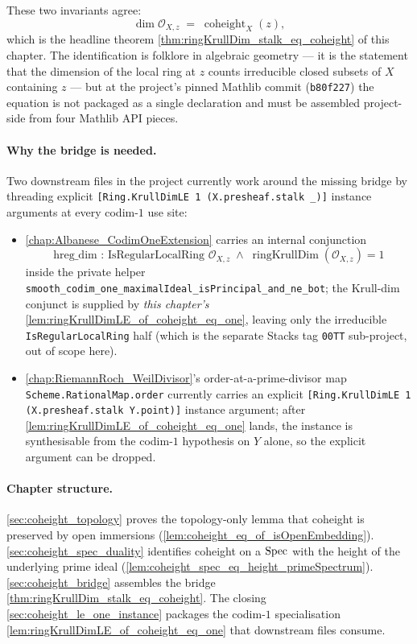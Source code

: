 These two invariants agree:
\[
  \dim \mathcal{O}_{X,z} \;=\; \operatorname{coheight}_X(z),
\]
which is the headline theorem \cref{thm:ringKrullDim_stalk_eq_coheight} of this
chapter. The identification is folklore in algebraic geometry --- it is the
statement that the dimension of the local ring at \(z\) counts irreducible
closed subsets of \(X\) containing \(z\) --- but at the project's pinned Mathlib
commit (\texttt{b80f227}) the equation is not packaged as a single declaration
and must be assembled project-side from four Mathlib API pieces.

\paragraph{Why the bridge is needed.} Two downstream files in the project
currently work around the missing bridge by threading explicit
\texttt{[Ring.KrullDimLE 1 (X.presheaf.stalk \_)]} instance arguments at every
codim-\(1\) use site:
\begin{itemize}
  \item \cref{chap:Albanese_CodimOneExtension} carries an internal conjunction
    \[
      \text{hreg\_dim : IsRegularLocalRing\ } \mathcal{O}_{X,z} \;\wedge\;
      \operatorname{ringKrullDim}(\mathcal{O}_{X,z}) = 1
    \]
    inside the private helper
    \texttt{smooth\_codim\_one\_maximalIdeal\_isPrincipal\_and\_ne\_bot};
    the Krull-dim conjunct is supplied by \emph{this chapter's}
    \cref{lem:ringKrullDimLE_of_coheight_eq_one}, leaving only the
    irreducible \texttt{IsRegularLocalRing} half (which is the separate
    Stacks tag \texttt{00TT} sub-project, out of scope here).
  \item \cref{chap:RiemannRoch_WeilDivisor}'s order-at-a-prime-divisor map
    \texttt{Scheme.RationalMap.order} currently carries an explicit
    \texttt{[Ring.KrullDimLE 1 (X.presheaf.stalk Y.point)]} instance argument;
    after \cref{lem:ringKrullDimLE_of_coheight_eq_one} lands, the instance is
    synthesisable from the codim-\(1\) hypothesis on \(Y\) alone, so the explicit
    argument can be dropped.
\end{itemize}

\paragraph{Chapter structure.} \cref{sec:coheight_topology} proves the
topology-only lemma that coheight is preserved by open immersions
(\cref{lem:coheight_eq_of_isOpenEmbedding}). \cref{sec:coheight_spec_duality}
identifies coheight on a \(\operatorname{Spec}\) with the height of the underlying prime ideal
(\cref{lem:coheight_spec_eq_height_primeSpectrum}). \cref{sec:coheight_bridge}
assembles the bridge \cref{thm:ringKrullDim_stalk_eq_coheight}. The closing
\cref{sec:coheight_le_one_instance} packages the codim-\(1\) specialisation
\cref{lem:ringKrullDimLE_of_coheight_eq_one} that downstream files consume.

